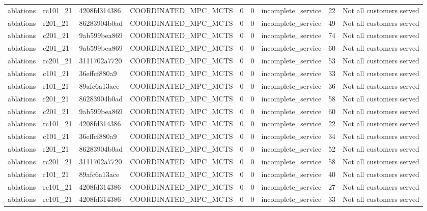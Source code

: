 \begin{table}
{\begin{tabular}{llllrrlrl}
ablations & rc101\_21 & 4208fd314386 & COORDINATED\_MPC\_MCTS & 0 & 0 & incomplete\_service & 22 & Not all customers served \\
ablations & r201\_21 & 86283904b0ad & COORDINATED\_MPC\_MCTS & 0 & 0 & incomplete\_service & 49 & Not all customers served \\
ablations & c201\_21 & 9ab599bea869 & COORDINATED\_MPC\_MCTS & 0 & 0 & incomplete\_service & 74 & Not all customers served \\
ablations & c201\_21 & 9ab599bea869 & COORDINATED\_MPC\_MCTS & 0 & 0 & incomplete\_service & 60 & Not all customers served \\
ablations & rc201\_21 & 3111702a7720 & COORDINATED\_MPC\_MCTS & 0 & 0 & incomplete\_service & 53 & Not all customers served \\
ablations & c101\_21 & 36effcf880a9 & COORDINATED\_MPC\_MCTS & 0 & 0 & incomplete\_service & 33 & Not all customers served \\
ablations & r101\_21 & 89afc6a13ace & COORDINATED\_MPC\_MCTS & 0 & 0 & incomplete\_service & 36 & Not all customers served \\
ablations & r201\_21 & 86283904b0ad & COORDINATED\_MPC\_MCTS & 0 & 0 & incomplete\_service & 58 & Not all customers served \\
ablations & c201\_21 & 9ab599bea869 & COORDINATED\_MPC\_MCTS & 0 & 0 & incomplete\_service & 60 & Not all customers served \\
ablations & rc101\_21 & 4208fd314386 & COORDINATED\_MPC\_MCTS & 0 & 0 & incomplete\_service & 22 & Not all customers served \\
ablations & c101\_21 & 36effcf880a9 & COORDINATED\_MPC\_MCTS & 0 & 0 & incomplete\_service & 34 & Not all customers served \\
ablations & r201\_21 & 86283904b0ad & COORDINATED\_MPC\_MCTS & 0 & 0 & incomplete\_service & 52 & Not all customers served \\
ablations & rc201\_21 & 3111702a7720 & COORDINATED\_MPC\_MCTS & 0 & 0 & incomplete\_service & 58 & Not all customers served \\
ablations & r101\_21 & 89afc6a13ace & COORDINATED\_MPC\_MCTS & 0 & 0 & incomplete\_service & 40 & Not all customers served \\
ablations & rc101\_21 & 4208fd314386 & COORDINATED\_MPC\_MCTS & 0 & 0 & incomplete\_service & 27 & Not all customers served \\
ablations & rc101\_21 & 4208fd314386 & COORDINATED\_MPC\_MCTS & 0 & 0 & incomplete\_service & 33 & Not all customers served \\

\end{tabular}}
\end{table}
